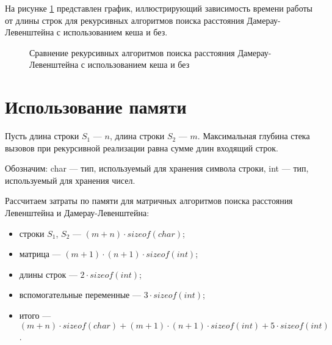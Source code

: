 \clearpage
На рисунке \ref{img:g2} представлен график, иллюстрирующий зависимость времени работы от длины строк для рекурсивных алгоритмов поиска расстояния Дамерау-Левенштейна с использованием кеша и без.

\begin{figure}[h!]
	\centering
	\caption{Сравнение рекурсивных алгоритмов поиска расстояния Дамерау-Левенштейна с использованием кеша и без}
	\label{img:g2}
\end{figure}
 
\section{Использование памяти}

Пусть длина строки $S_1$ --- $n$, длина строки $S_2$ --- $m$. Максимальная глубина стека вызовов при рекурсивной реализации равна сумме длин входящий строк.

Обозначим: char --- тип, используемый для хранения символа строки, int --- тип, используемый для хранения чисел.

Рассчитаем затраты по памяти для матричных алгоритмов поиска расстояния Левенштейна и Дамерау-Левенштейна:
\begin{itemize}
	\item строки $S_1$, $S_2$ --- $(m + n) \cdot sizeof(char)$;
	\item матрица --- $(m + 1) \cdot (n + 1) \cdot sizeof(int)$;
	\item длины строк --- $2 \cdot sizeof(int)$;
	\item вспомогательные переменные --- $3 \cdot sizeof(int)$;
	\item итого --- $(m + n) \cdot sizeof(char) + (m + 1) \cdot (n + 1) \cdot sizeof(int) + 5 \cdot sizeof(int)$.
\end{itemize}

